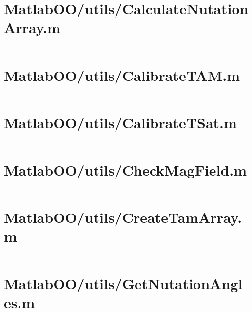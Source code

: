 \pagebreak
\section*{MatlabOO/utils/CalculateNutationArray.m}\label{code:MatlabOO/utils/CalculateNutationArray.m}
\inputminted[linenos,fontsize=\scriptsize]{matlab}{/home/dcouture/git/mathyourlife/TSatPy/beta_versions/matlab_object_oriented/utils/CalculateNutationArray.m}

\pagebreak
\section*{MatlabOO/utils/CalibrateTAM.m}\label{code:MatlabOO/utils/CalibrateTAM.m}
\inputminted[linenos,fontsize=\scriptsize]{matlab}{/home/dcouture/git/mathyourlife/TSatPy/beta_versions/matlab_object_oriented/utils/CalibrateTAM.m}

\pagebreak
\section*{MatlabOO/utils/CalibrateTSat.m}\label{code:MatlabOO/utils/CalibrateTSat.m}
\inputminted[linenos,fontsize=\scriptsize]{matlab}{/home/dcouture/git/mathyourlife/TSatPy/beta_versions/matlab_object_oriented/utils/CalibrateTSat.m}

\pagebreak
\section*{MatlabOO/utils/CheckMagField.m}\label{code:MatlabOO/utils/CheckMagField.m}
\inputminted[linenos,fontsize=\scriptsize]{matlab}{/home/dcouture/git/mathyourlife/TSatPy/beta_versions/matlab_object_oriented/utils/CheckMagField.m}

\pagebreak
\section*{MatlabOO/utils/CreateTamArray.m}\label{code:MatlabOO/utils/CreateTamArray.m}
\inputminted[linenos,fontsize=\scriptsize]{matlab}{/home/dcouture/git/mathyourlife/TSatPy/beta_versions/matlab_object_oriented/utils/CreateTamArray.m}

\pagebreak
\section*{MatlabOO/utils/GetNutationAngles.m}\label{code:MatlabOO/utils/GetNutationAngles.m}
\inputminted[linenos,fontsize=\scriptsize]{matlab}{/home/dcouture/git/mathyourlife/TSatPy/beta_versions/matlab_object_oriented/utils/GetNutationAngles.m}

